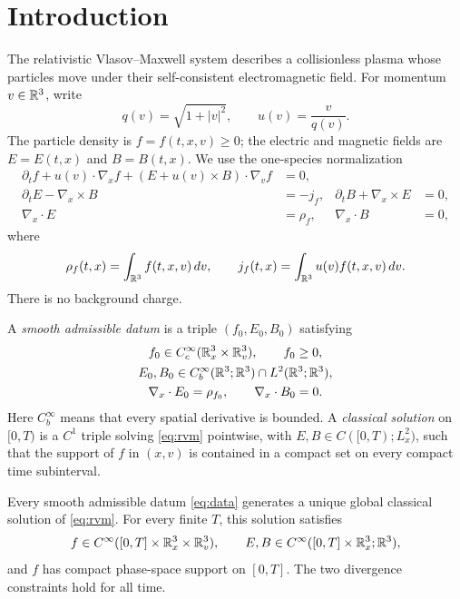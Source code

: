 \section{Introduction}\label{sec:introduction}
The relativistic Vlasov--Maxwell system describes a collisionless plasma
whose particles move under their self-consistent electromagnetic field.
For momentum $v\in\mathbb R^3$, write
\[
 q(v)=\sqrt{1+|v|^2},\qquad u(v)=\frac{v}{q(v)}.
\]
The particle density is $f=f(t,x,v)\ge0$; the electric and magnetic fields
are $E=E(t,x)$ and $B=B(t,x)$. We use the one-species normalization
\begin{equation}\label{eq:rvm}
\begin{aligned}
 \partial_t f+u(v)\cdot\nabla_x f+
     (E+u(v)\times B)\cdot\nabla_v f&=0,\\
 \partial_t E-\nabla_x\times B&=-j_f,
 &\partial_t B+\nabla_x\times E&=0,\\
 \nabla_x\cdot E&=\rho_f,
 &\nabla_x\cdot B&=0,
\end{aligned}
\end{equation}
where
\[
 \rho_f(t,x)=\int_{\mathbb R^3}f(t,x,v)\,dv,
 \qquad j_f(t,x)=\int_{\mathbb R^3}u(v)f(t,x,v)\,dv.
\]
There is no background charge.

A \emph{smooth admissible datum} is a triple $(f_0,E_0,B_0)$ satisfying
\begin{equation}\label{eq:data}
\begin{gathered}
 f_0\in C_c^\infty(\mathbb R^3_x\times\mathbb R^3_v),\qquad f_0\ge0,\\
 E_0,B_0\in C_b^\infty(\mathbb R^3;\mathbb R^3)\cap L^2(\mathbb R^3;\mathbb R^3),\\
 \nabla_x\cdot E_0=\rho_{f_0},\qquad \nabla_x\cdot B_0=0.
\end{gathered}
\end{equation}
Here $C_b^\infty$ means that every spatial derivative is bounded.
A \emph{classical solution} on $[0,T)$ is a $C^1$ triple solving
\eqref{eq:rvm} pointwise, with
$E,B\in C([0,T);L^2_x)$, such that the support of $f$ in $(x,v)$
is contained in a compact set on every compact time subinterval.

\begin{theorem}\label{thm:global}
Every smooth admissible datum \eqref{eq:data} generates a unique global
classical solution of \eqref{eq:rvm}. For every finite $T$, this solution
satisfies
\[
 f\in C^\infty([0,T]\times\mathbb R^3_x\times\mathbb R^3_v),\qquad
 E,B\in C^\infty([0,T]\times\mathbb R^3_x;\mathbb R^3),
\]
and $f$ has compact phase-space support on $[0,T]$.
The two divergence constraints hold for all time.
\end{theorem}

